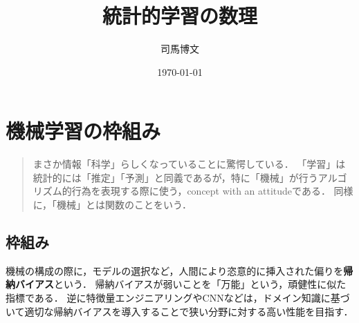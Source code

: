 \documentclass[uplatex,dvipdfmx]{jsreport}
\title{統計的学習の数理}
\author{司馬博文}
\date{\today}
\begin{document}
\tableofcontents

\chapter{機械学習の枠組み}

\begin{quotation}
    まさか情報「科学」らしくなっていることに驚愕している．
    「学習」は統計的には「推定」「予測」と同義であるが，特に「機械」が行うアルゴリズム的行為を表現する際に使う，concept with an attitudeである．
    同様に，「機械」とは関数のことをいう．
\end{quotation}

\section{枠組み}

\begin{tcolorbox}[colframe=ForestGreen, colback=ForestGreen!10!white,breakable,colbacktitle=ForestGreen!40!white,coltitle=black,fonttitle=\bfseries\sffamily,
title=]
    機械の構成の際に，モデルの選択など，人間により恣意的に挿入された偏りを\textbf{帰納バイアス}という．
    帰納バイアスが弱いことを「万能」という，頑健性に似た指標である．
    逆に特徴量エンジニアリングやCNNなどは，ドメイン知識に基づいて適切な帰納バイアスを導入することで狭い分野に対する高い性能を目指す．
\end{tcolorbox}
\end{document}
